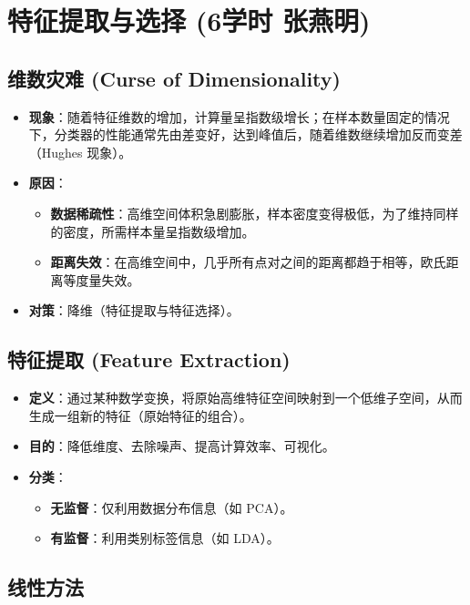 \documentclass[a4paper, 11pt]{ctexart}
\begin{document}
\newpage
\section{特征提取与选择 \small{(6学时 张燕明)}}

\subsection{维数灾难 (Curse of Dimensionality)}
\begin{itemize}
    \item \textbf{现象}：随着特征维数的增加，计算量呈指数级增长；在样本数量固定的情况下，分类器的性能通常先由差变好，达到峰值后，随着维数继续增加反而变差（Hughes 现象）。
    \item \textbf{原因}：
    \begin{itemize}
        \item \textbf{数据稀疏性}：高维空间体积急剧膨胀，样本密度变得极低，为了维持同样的密度，所需样本量呈指数级增加。
        \item \textbf{距离失效}：在高维空间中，几乎所有点对之间的距离都趋于相等，欧氏距离等度量失效。
    \end{itemize}
    \item \textbf{对策}：降维（特征提取与特征选择）。
\end{itemize}

\subsection{特征提取 (Feature Extraction)}
\begin{itemize}
    \item \textbf{定义}：通过某种数学变换，将原始高维特征空间映射到一个低维子空间，从而生成一组新的特征（原始特征的组合）。
    \item \textbf{目的}：降低维度、去除噪声、提高计算效率、可视化。
    \item \textbf{分类}：
    \begin{itemize}
        \item \textbf{无监督}：仅利用数据分布信息（如 PCA）。
        \item \textbf{有监督}：利用类别标签信息（如 LDA）。
    \end{itemize}
\end{itemize}

\subsection{线性方法}
\end{document}
